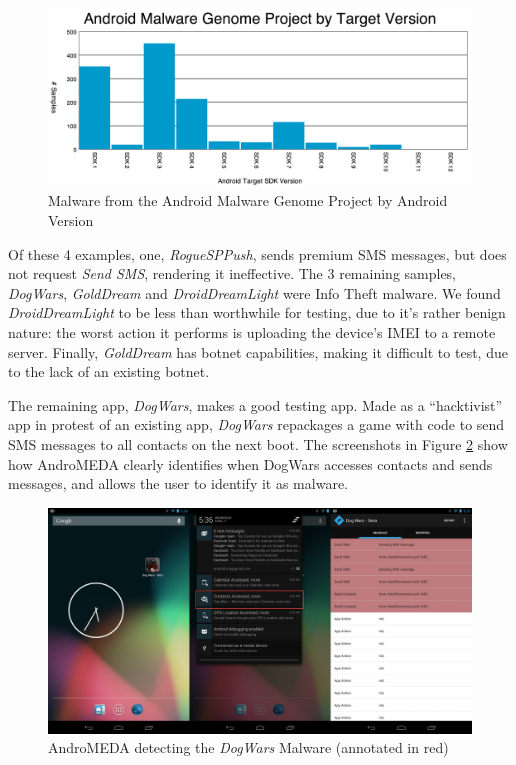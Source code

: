 \begin{figure}[h]
\begin{center}
\includegraphics[width=1.0\columnwidth]{figs/MalwareAndSDK}
\caption{Malware from the Android Malware Genome Project by Android Version }
\label{fig:malwaresdk}
\end{center}
\end{figure}

Of these 4 examples, one, \textit{RogueSPPush}, sends premium SMS messages, but does not request \textit{Send SMS}, rendering it ineffective. The 3 remaining samples, \textit{DogWars}, \textit{GoldDream} and \textit{DroidDreamLight} were Info Theft malware. We found \textit{DroidDreamLight} to be less than worthwhile for testing, due to it's rather benign nature: the worst action it performs is uploading the device's IMEI to a remote server. Finally, \textit{GoldDream} has botnet capabilities, making it difficult to test, due to the lack of an existing botnet.

The remaining app, \textit{DogWars}, makes a good testing app. Made as a ``hacktivist'' app in protest of an existing app\citep{symantecdogwars}, \textit{DogWars} repackages a game with code to send SMS messages to all contacts on the next boot. The screenshots in Figure \ref{fig:dogwars_visual} show how AndroMEDA clearly identifies when DogWars accesses contacts and sends messages, and allows the user to identify it as malware.

\begin{figure}[h]
\begin{center}
\includegraphics[width=1.0\columnwidth]{figs/dogwars_detection}
\caption{AndroMEDA detecting the \textit{DogWars} Malware (annotated in red) }
\label{fig:dogwars_visual}
\end{center}
\end{figure}

